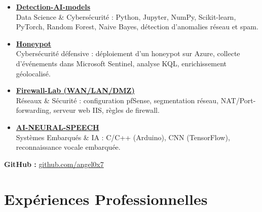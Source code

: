 \documentclass[a4paper,10pt]{article}
\begin{document}
\begin{itemize}[leftmargin=*]
  \item \href{https://github.com/angel0x7/Detection-AI-models-}{\textbf{Detection-AI-models}} \\
  Data Science \& Cybersécurité : Python, Jupyter, NumPy, Scikit-learn, PyTorch, Random Forest, Naive Bayes, détection d’anomalies réseau et spam.

  \item \href{https://github.com/angel0x7/Honeypot-}{\textbf{Honeypot}} \\
  Cybersécurité défensive : déploiement d’un honeypot sur Azure, collecte d’événements dans Microsoft Sentinel, analyse KQL, enrichissement géolocalisé.

  \item \href{https://github.com/angel0x7/Firewall-Lab-WAN-LAN-DMZ-}{\textbf{Firewall-Lab (WAN/LAN/DMZ)}} \\
  Réseaux \& Sécurité : configuration pfSense, segmentation réseau, NAT/Port-forwarding, serveur web IIS, règles de firewall.

  \item \href{https://github.com/angel0x7/AI-NEURAL-SPEECH-}{\textbf{AI-NEURAL-SPEECH}} \\
  Systèmes Embarqués \& IA : C/C++ (Arduino), CNN (TensorFlow), reconnaissance vocale embarquée.


\end{itemize}

\noindent
\textbf{GitHub :} \href{https://github.com/angel0x7}{github.com/angel0x7}

\section*{Expériences Professionnelles}
\end{document}
